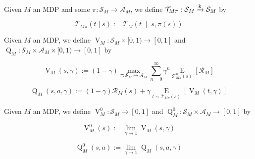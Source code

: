 \documentclass[anon,12pt]{colt2018} %
\newcommand{\Comment}[1]{}
\newcommand{\AB}[1]{\left[#1\right]}
\newcommand{\APM}[2]{\left(#1\;\middle\vert\;#2\right)}
\newcommand{\Ea}[2]{\underset{#1}{\operatorname{E}}\AB{#2}}
\newcommand{\K}{\xrightarrow{\textnormal{k}}}
\newcommand{\A}{\mathcal{A}}
\newcommand{\St}{\mathcal{S}}
\newcommand{\T}{\mathcal{T}}
\newcommand{\R}{\mathcal{R}}
\newcommand{\V}{\operatorname{V}}
\newcommand{\Q}{\operatorname{Q}}
\begin{document}
\begin{samepage}
\begin{definition}

Given $M$ an MDP and some $\pi: \St_M \rightarrow \A_M$, we define $\T_{M\pi}: \St_M \K \St_M$ by

\begin{equation}
\T_{M\pi}(t \mid s) := \T_M\APM{t}{s,\pi(s)}
\end{equation}

\Comment{That is, $\T_{M\pi}$ is the transition kernel of the Markov chain resulting from policy $\pi$ interacting with environment $M$.}

\end{definition}
\end{samepage}

\begin{samepage}
\begin{definition}

Given $M$ an MDP, we define $\V_M : \St_M \times [0,1) \rightarrow [0,1]$ and $\Q_M: \St_M \times \A_M \times [0,1) \rightarrow [0,1]$ by

\begin{equation}
\V_M(s,\gamma):=(1-\gamma) \max_{\pi: \St_M \rightarrow \A_M} \sum_{n=0}^\infty \gamma^n \Ea{\T_{M\pi}^n(s)}{\R_M}
\end{equation}

\begin{equation}
\Q_M(s,a,\gamma):=(1-\gamma)\R_M(s)+\gamma\Ea{t \sim \T_{M\pi}(s)}{\V_M(t,\gamma)}
\end{equation}

\Comment{Thus, $\V_M(s,\gamma)$ is the maximal value that can be extracted from state $s$ and $\Q_M(s,a,\gamma)$ is the maximal value that can be extracted from state $s$ after performing action $a$.}

\end{definition}
\end{samepage}

\begin{samepage}
\begin{definition}

Given $M$ an MDP, we define $\V^0_M : \St_M \rightarrow [0,1]$ and $\Q^0_M: \St_M \times \A_M \rightarrow [0,1]$ by

\begin{equation}
\V_M^0(s) := \lim_{\gamma \rightarrow 1} \V_M(s,\gamma)
\end{equation}

\begin{equation}
\Q_M^0(s,a) := \lim_{\gamma \rightarrow 1} \Q_M(s,a,\gamma)
\end{equation}

\Comment{Indeed, the limits above are guaranteed to exist. We can think of them as describing the \enquote{long term planning} regime.}

\end{definition}
\end{samepage}
\end{document}
